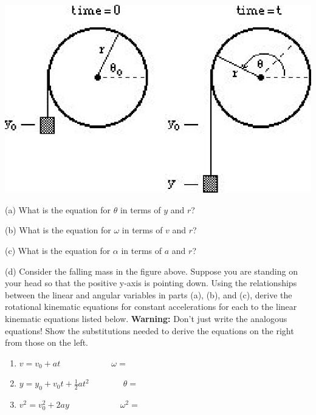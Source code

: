 \vspace{0.3cm}
{\par\centering \includegraphics{rotation_fig9.eps} \par}
\vspace{0.3cm}

(a) What is the equation for \( \theta  \) in terms of $y$ and $r$?
\vspace{10mm}

(b) What is the equation for \( \omega  \) in terms of $v$ and $r$?
\vspace{10mm}

(c) What is the equation for \( \alpha  \) in terms of $a$ and $r$?
\vspace{10mm}

(d) Consider the falling mass in the figure above. Suppose you are standing
on your head so that the positive y-axis is pointing down. Using the relationships
between the linear and angular variables in parts (a), (b), and (c), derive
the rotational kinematic equations for constant accelerations for each to the
linear kinematic equations listed below. \textbf{Warning:} Don't just write
the analogous equations! Show the substitutions needed to derive the equations
on the right from those on the left.

\begin{enumerate}
\item \( v=v_{0}+at\qquad \qquad \qquad \omega = \)\vspace{20mm}

\item \( y=y_{0}+v_{0}t+\frac{1}{2}at^{2}\qquad \qquad \theta = \)\vspace{20mm}

\item \( v^{2}=v_{0}^{2}+2ay\qquad \qquad \qquad \omega ^{2}= \)
\end{enumerate}
